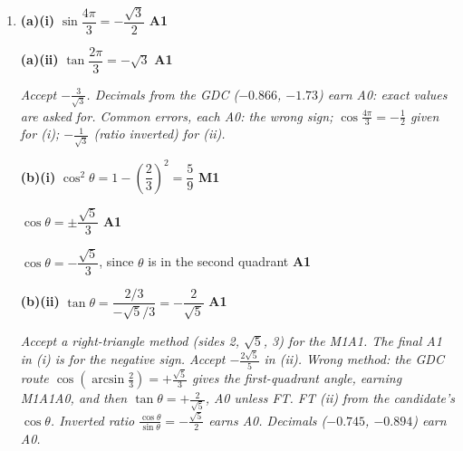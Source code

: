 \documentclass[12pt, twoside]{article}
\begin{document}
\begin{enumerate}[itemsep=0.2cm]
\textbf{(d)} \textbf{Method 1 (sine rule).}

$P\hat{Q}R = 180 - 38 - 59.5335\ldots = 82.4665\ldots^\circ$ or
$P\hat{Q}R = 180 - 38 - 120.466\ldots = 21.5335\ldots^\circ$
\hfill \textbf{M1}

$PR = \dfrac{10\sin 82.4665\ldots^\circ}{\sin 38^\circ} = 16.1$
\quad $(16.1024\ldots)$ \hfill \textbf{A1}

$PR = \dfrac{10\sin 21.5335\ldots^\circ}{\sin 38^\circ} = 5.96$
\quad $(5.96181\ldots)$ \hfill \textbf{A1}

difference $= 16.1024\ldots - 5.96181\ldots = 10.1$ cm
\quad $(10.1406\ldots)$ \hfill \textbf{A1}

\emph{M1 for a third angle found from either value in (c). Method 2,
cosine rule: $10^{2} = 14^{2} + PR^{2} - 2 \times 14 \times PR\cos
38^\circ$ (M1), so $PR^{2} - 22.0643\ldots PR + 96 = 0$, $PR = 16.1$ or
$5.96$ (A1A1), difference $10.1$ (A1). Accept $16.1 - 5.96 = 10.14$. FT
from (c). Wrong methods: one length only earns M1A1A0A0; the sum $22.1$
earns the final A0.}

\newpage

\item[3.] [Maximum mark: 9]

\textbf{(a)(i)} $\sin\dfrac{4\pi}{3} = -\dfrac{\sqrt{3}}{2}$ \hfill \textbf{A1}

\textbf{(a)(ii)} $\tan\dfrac{2\pi}{3} = -\sqrt{3}$ \hfill \textbf{A1}

\emph{Accept $-\frac{3}{\sqrt{3}}$. Decimals from the GDC ($-0.866$,
$-1.73$) earn A0: exact values are asked for. Common errors, each A0: the
wrong sign; $\cos\frac{4\pi}{3} = -\frac{1}{2}$ given for (i);
$-\frac{1}{\sqrt{3}}$ (ratio inverted) for (ii).}

\textbf{(b)(i)} $\cos^{2}\theta = 1 - \left(\dfrac{2}{3}\right)^{2}
= \dfrac{5}{9}$ \hfill \textbf{M1}

$\cos\theta = \pm\dfrac{\sqrt{5}}{3}$ \hfill \textbf{A1}

$\cos\theta = -\dfrac{\sqrt{5}}{3}$, since $\theta$ is in the second
quadrant \hfill \textbf{A1}

\textbf{(b)(ii)} $\tan\theta = \dfrac{2/3}{-\sqrt{5}/3} = -\dfrac{2}{\sqrt{5}}$
\hfill \textbf{A1}

\emph{Accept a right-triangle method (sides 2, $\sqrt{5}$, 3) for the
M1A1. The final A1 in (i) is for the negative sign. Accept
$-\frac{2\sqrt{5}}{5}$ in (ii). Wrong method: the GDC route
$\cos\left(\arcsin\frac{2}{3}\right) = +\frac{\sqrt{5}}{3}$ gives the
first-quadrant angle, earning M1A1A0, and then $\tan\theta =
+\frac{2}{\sqrt{5}}$, A0 unless FT. FT (ii) from the candidate's
$\cos\theta$. Inverted ratio $\frac{\cos\theta}{\sin\theta} =
-\frac{\sqrt{5}}{2}$ earns A0. Decimals ($-0.745$, $-0.894$) earn A0.}


\end{enumerate}
\end{document}
